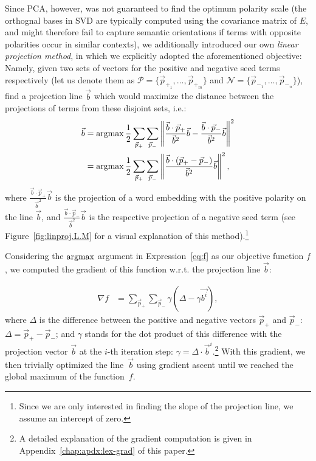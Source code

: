 Since PCA, however, was not guaranteed to find the optimum polarity
scale (the orthognal bases in SVD are typically computed using the
covariance matrix of $E$, and might therefore fail to capture semantic
orientations if terms with opposite polarities occur in similar
contexts), we additionally introduced our own \emph{linear projection
  method}, in which we explicitly adopted the aforementioned
objective: Namely, given two sets of vectors for the positive and
negative seed terms respectively (let us denote them as
$\mathcal{P} = \{\vec{p}_{+_1},\ldots,\vec{p}_{+_m}\}$ and
$\mathcal{N} = \{\vec{p}_{-_1},\ldots,\vec{p}_{-_n}\}$), find a
projection line $\vec{b}$ which would maximize the distance between
the projections of terms from these disjoint sets, i.e.: {\small%
\begin{align}
  \small
  \vec{b} &=\argmax\frac{1}{2}\sum_{\vec{p}_+}\sum_{\vec{p}_-}%
  \left\lVert\frac{\vec{b}\cdot\vec{p}_+}{\vec{b}^2}\vec{b}%
  - \frac{\vec{b}\cdot\vec{p}_-}{\vec{b}^2}\vec{b}\right\rVert^2\\
  &=\argmax\frac{1}{2}\sum_{\vec{p}_+}\sum_{\vec{p}_-}\left\lVert\frac{\vec{b}%
    \cdot\left(\vec{p}_{+}-\vec{p}_{-}\right)}{\vec{b}^2}\vec{b}\right\rVert^2,\label{eq:f}%
\end{align}\normalsize}%
where $\frac{\vec{b}\cdot\vec{p}_+}{\vec{b}^2}\vec{b}$ is the
projection of a word embedding with the positive polarity on the line
$\vec{b}$, and $\frac{\vec{b}\cdot\vec{p}_-}{\vec{b}^2}\vec{b}$ is the
respective projection of a negative seed term (see
Figure~\ref{fig:linproj.L.M} for a visual explanation of this
method).\footnote{Since we are only interested in finding the slope of
  the projection line, we assume an intercept of zero.}

Considering the $\argmax$ argument in Expression~\ref{eq:f} as our
objective function $f$, we computed the gradient of this function
w.r.t. the projection line $\vec{b}$:

{\small%
  \begin{align}
    \nabla f &= \sum_{\vec{p}_+}\sum_{\vec{p}_-}%
    \gamma\left(\Delta - \gamma\vec{b^{i}}\right),\label{eq:prj-line-grad}%
\end{align}\normalsize}%
where $\Delta$ is the difference between the positive and negative
vectors $\vec{p}_{+}$ and $\vec{p}_{-}$:
$\Delta = \vec{p}_{+}-\vec{p}_{-}$; and $\gamma$ stands for the dot
product of this difference with the projection vector $\vec{b}$ at the
$i$-th iteration step: $\gamma = \Delta \cdot \vec{b}^i$.\footnote{A
  detailed explanation of the gradient computation is given in
  Appendix~\ref{chap:apdx:lex-grad} of this paper.}  With this
gradient, we then trivially optimized the line~$\vec{b}$ using
gradient ascent until we reached the global maximum of the
function~$f$.

